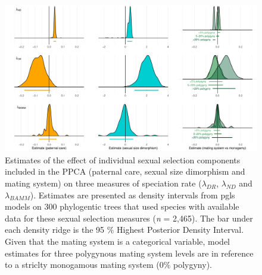 \documentclass[]{article}
\begin{document}
\begin{figure}
\centering
\includegraphics{Figures/Individual_SS_Estimates.pdf}
\caption{Estimates of the effect of individual sexual selection
components included in the PPCA (paternal care, sexual size dimorphism
and mating system) on three measures of speciation rate
(\(\lambda_{DR}\), \(\lambda_{ND}\) and \(\lambda_{BAMM}\)). Estimates
are presented as density intervals from pgls models on 300 phylogentic
trees that used species with available data for these sexual selection
measures (\emph{n} = 2,465). The bar under each density ridge is the 95
\% Highest Posterior Density Interval. Given that the mating system is a
categorical variable, model estimates for three polygynous mating system
levels are in reference to a striclty monogamous mating system (0\%
polygyny). \label{SS_components}}
\end{figure}
\end{document}
